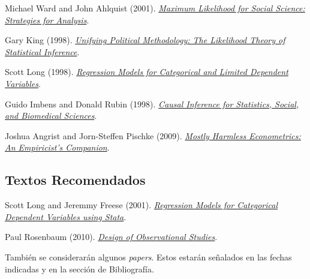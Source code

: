 \documentclass[letterpaper]{article}
\renewenvironment{itemize}{
  \begin{list}{}{
    \setlength{\leftmargin}{1.5em}
  }
}{
  \end{list}
}
\begin{document}
\begin{itemize}
  \item[$\bullet$] Michael Ward and John Ahlquist (2001). \href{https://github.com/hbahamonde/MLE/raw/master/Readings/Ward_Ahlquist.pdf}{\emph{Maximum Likelihood for Social Science: Strategies for Analysis}}.
  \item[$\bullet$] Gary King (1998). \href{https://github.com/hbahamonde/MLE/raw/master/Readings/King.pdf}{\emph{Unifying Political Methodology: The Likelihood Theory of Statistical Inference}}.
  \item[$\bullet$] Scott Long (1998). \href{https://github.com/hbahamonde/MLE/raw/master/Readings/Long.pdf}{\emph{Regression Models for Categorical and Limited Dependent Variables}}.
  \item[$\bullet$] Guido Imbens and Donald Rubin (1998). \href{https://github.com/hbahamonde/MLE/raw/master/Readings/Imbens_Rubin.pdf}{\emph{Causal Inference for Statistics, Social, and Biomedical Sciences}}.
  \item[$\bullet$] Joshua Angrist and Jorn-Steffen Pischke (2009). \href{https://github.com/hbahamonde/MLE/raw/master/Readings/MHE.pdf}{\emph{Mostly Harmless Econometrics: An Empiricist's Companion}}.

\end{itemize}

\subsection*{Textos Recomendados}

\begin{itemize}
	\item[$\bullet$] Scott Long and Jeremmy Freese (2001). \href{https://github.com/hbahamonde/MLE/raw/master/Readings/Long_Freese_STATA.pdf}{\emph{Regression Models for Categorical Dependent Variables using Stata}}.
	\item[$\bullet$] Paul Rosenbaum (2010). \href{https://github.com/hbahamonde/MLE/raw/master/Readings/Rosenbaum.pdf}{\emph{Design of Observational Studies}}.
\end{itemize}


\begin{itemize}
\item[{\color{red}\Pointinghand}] Tambi\'en se considerar\'an algunos \emph{papers}. Estos estar\'an se\~nalados en las fechas indicadas y en la secci\'on de Bibliograf\'ia.
\end{itemize}
\end{document}
